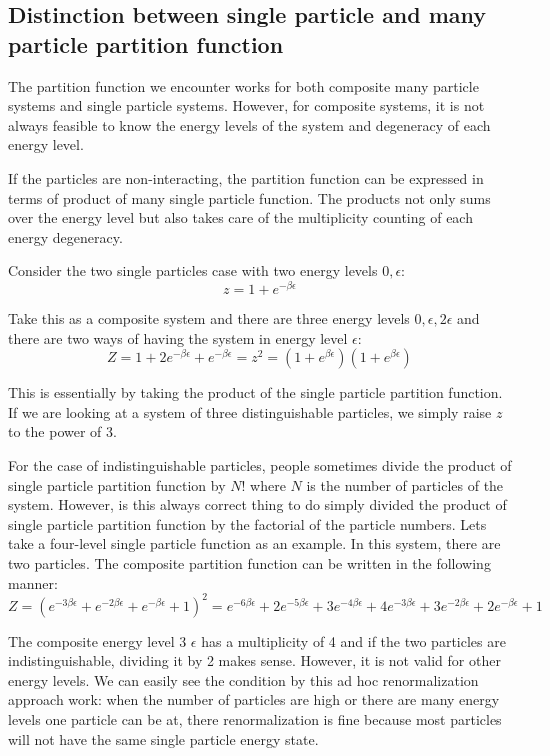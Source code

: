 \documentclass[12pt, oneside]{article}   	%
\begin{document}
\subsection{Distinction between single particle and many particle partition function}
\par 
The partition function we encounter works for both composite many particle systems and single particle systems. However, for composite systems, it is not always feasible to know the energy levels of the system and degeneracy of each energy level. 
\par 
If the particles are non-interacting, the partition function can be expressed in terms of product of many single particle function. The products not only sums over the energy level but also takes care of the multiplicity counting of each energy degeneracy. 
\par 
Consider the two single particles case with two energy levels ${0, \epsilon}$:
$$z = 1 + e^{-\beta \epsilon}$$
\par 
Take this as a composite system and there are three energy levels $0, \epsilon, 2\epsilon$ and there are two ways of having the system in energy level $\epsilon$: 
$$Z = 1 + 2 e^{-\beta \epsilon } + e^{-\beta \epsilon} = z^2 = (1 + e^{\beta \epsilon})( 1+ e^{\beta \epsilon})$$ 
\par
This is essentially by taking the product of the single particle partition function. If we are looking at a system of three distinguishable particles, we simply raise $z$ to the power of 3. 
\par
For the case of indistinguishable particles, people sometimes divide the product of single particle partition function by $N!$ where $N$ is the number of particles of the system.
However, is this always correct thing to do simply divided the product of single particle partition function by the factorial of the particle numbers. Lets take a four-level single particle function as an example. In this system, there are two particles. The composite partition function can be written in the following manner: 
$$Z = \left(e^{-3 \beta  \epsilon }+e^{-2 \beta  \epsilon }+e^{-\beta  \epsilon }+1\right)^2 = e^{-6 \beta  \epsilon }+2 e^{-5 \beta  \epsilon }+3 e^{-4 \beta  \epsilon }+4 e^{-3 \beta  \epsilon }+3 e^{-2 \beta  \epsilon }+2 e^{-\beta  \epsilon }+1$$
\par
The composite energy level 3 $\epsilon$ has a multiplicity of 4 and if the two particles are indistinguishable, dividing it by 2 makes sense. However, it is not valid for other energy levels. We can easily see the condition by this ad hoc renormalization approach work: when the number of particles are high or there are many energy levels one particle can be at, there renormalization is fine because most particles will not have the same single particle energy state. 
\end{document}
